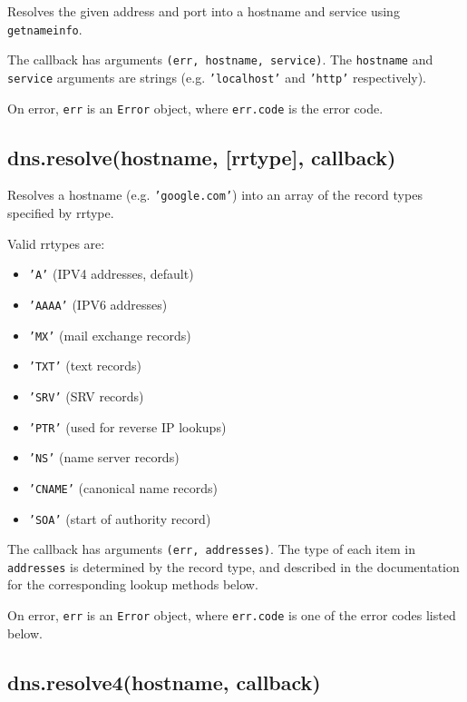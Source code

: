 Resolves the given address and port into a hostname and service using
\texttt{getnameinfo}.

The callback has arguments \texttt{(err, hostname, service)}. The
\texttt{hostname} and \texttt{service} arguments are strings (e.g.
\texttt{'localhost'} and \texttt{'http'} respectively).

On error, \texttt{err} is an \texttt{Error} object, where
\texttt{err.code} is the error code.

\subsection{dns.resolve(hostname, {[}rrtype{]},
callback)}\label{dns.resolvehostname-rrtype-callback}

Resolves a hostname (e.g. \texttt{'google.com'}) into an array of the
record types specified by rrtype.

Valid rrtypes are:

\begin{itemize}
\itemsep1pt\parskip0pt
\item
  \texttt{'A'} (IPV4 addresses, default)
\item
  \texttt{'AAAA'} (IPV6 addresses)
\item
  \texttt{'MX'} (mail exchange records)
\item
  \texttt{'TXT'} (text records)
\item
  \texttt{'SRV'} (SRV records)
\item
  \texttt{'PTR'} (used for reverse IP lookups)
\item
  \texttt{'NS'} (name server records)
\item
  \texttt{'CNAME'} (canonical name records)
\item
  \texttt{'SOA'} (start of authority record)
\end{itemize}

The callback has arguments \texttt{(err, addresses)}. The type of each
item in \texttt{addresses} is determined by the record type, and
described in the documentation for the corresponding lookup methods
below.

On error, \texttt{err} is an \texttt{Error} object, where
\texttt{err.code} is one of the error codes listed below.

\subsection{dns.resolve4(hostname,
callback)}\label{dns.resolve4hostname-callback}

